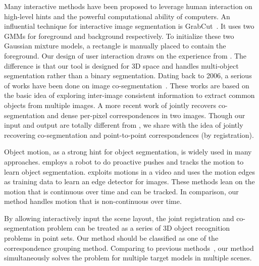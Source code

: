 %
Many interactive methods have been proposed to leverage human interaction on high-level hints and the powerful computational ability of computers.
%
An influential technique for interactive image segmentation is GrabCut~\cite{grabcut}. 
It uses two GMMs for foreground and background respectively. 
To initialize these two Gaussian mixture models, a rectangle is manually placed to contain the foreground. 
Our design of user interaction draws on the experience from \cite{grabcut}. 
%
The difference is that our tool is designed for 3D space and handles multi-object segmentation rather than a binary segmentation. 
%
Dating back to 2006, a serious of works have been done on image co-segmentation~\cite{COSEG}.
These works are based on the basic idea of exploring inter-image consistent information to extract common objects from multiple images.
%
A more recent work of \cite{Taniai_2016_CVPR} jointly recovers co-segmentation and dense per-pixel correspondences in two images. 
Though our input and output are totally different from \cite{Taniai_2016_CVPR}, we share with \cite{Taniai_2016_CVPR} the idea of jointly recovering co-segmentation and point-to-point correspondences (by registration).

Object motion, as a strong hint for object segmentation, is widely used in many approaches.
\cite{Xu:2015:ACS:2816795.2818075} employs a robot to do proactive pushes and tracks the motion to learn object segmentation. 
\cite{unsupervisededge} exploits motions in a video and uses the motion edges as training data to learn an edge detector for images.
These methods lean on the motion that is continuous over time and can be tracked. 
In comparison, our method handles motion that is non-continuous over time.

By allowing interactively input the scene layout, the joint registration and co-segmentation problem can be treated as a series of 3D object recognition problems in point sets. 
%
Our method should be classified as one of the correspondence grouping method. 
Comparing to previous methods~\cite{hough,LOF}, our method simultaneously solves the problem for multiple target models in multiple scenes.
